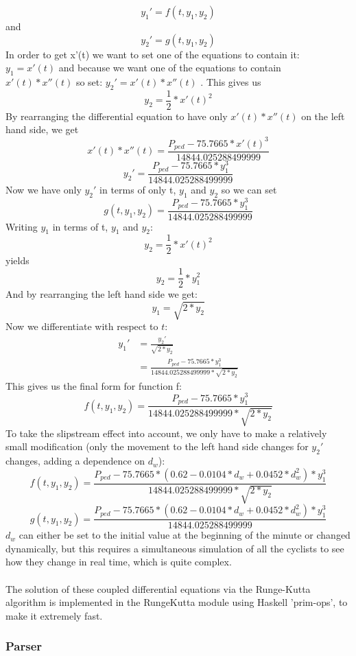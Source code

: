 \documentclass[10pt, a4paper]{report}
\begin{document}
$$ y_1' = f( t, y_1, y_2 )$$ and $$y_2' = g( t, y_1, y_2 )$$
In order to get x'(t) we want to set one of the equations to contain it: $y_1 = x'(t)$ and because we want one of the equations to contain $x'(t) * x''(t) $ so set: $y_2' = x'( t ) * x''( t )$ .
This gives us $$ y_{2} = \frac{1}{2} * x'(t)^2 $$
By rearranging the differential equation to have only $ x'( t ) * x''( t )$ on the left hand side, we get
$$ x'( t ) * x''( t ) = \frac{P_{ped} - 75.7665 * x'( t ) ^ 3}{14844.025288499999}$$
$$ y_2' = \frac{P_{ped} - 75.7665 * y_1 ^ 3}{14844.025288499999}$$
Now we have only $y_2'$ in terms of only t, $y_1$ and $y_2$ so we can set $$ g( t, y_1, y_2 ) = \frac{P_{ped} - 75.7665 * y_1 ^ 3}{14844.025288499999}$$
Writing $y_1$ in terms of t, $y_1$ and $y_2$: $$y_2 = \frac{1}{2} * x'(t)^2$$ yields $$y_2 = \frac{1}{2} * y_1^2$$
And by rearranging the left hand side we get:
$$y_1 = \sqrt{2 * y_2}$$
Now we differentiate with respect to $t$:
\begin{align*}
y_1' & = \frac{y_2'}{\sqrt{2 * y_2}}\\
& = \frac{P_{ped} - 75.7665 * y_1 ^ 3}{14844.025288499999 * \sqrt{2 * y_2}}
\end{align*}
This gives us the final form for function f:
$$ f(t, y_1, y_2) = \frac{P_{ped} - 75.7665 * y_1 ^ 3}{14844.025288499999 * \sqrt{2 * y_2}}$$
To take the slipstream effect into account, we only have to make a relatively small modification (only the movement to the left hand side changes for $y_2'$ changes, adding a dependence on $d_w$):
$$ f(t, y_1, y_2) = \frac{P_{ped} - 75.7665 * (0.62 - 0.0104*d_w + 0.0452*d_w^2) * y_1 ^ 3}{14844.025288499999 * \sqrt{2 * y_2}}$$
$$ g( t, y_1, y_2 ) = \frac{P_{ped} - 75.7665 * (0.62 - 0.0104*d_w + 0.0452*d_w^2) * y_1 ^ 3}{14844.025288499999}$$
$d_w$ can either be set to the initial value at the beginning of the minute or changed dynamically, but this requires a simultaneous simulation of all the cyclists to see how they change in real time, which is quite complex.\\\\
The solution of these coupled differential equations via the Runge-Kutta algorithm is implemented in the RungeKutta module using Haskell 'prim-ops', to make it extremely fast.

\subsubsection{Parser}
\end{document}
